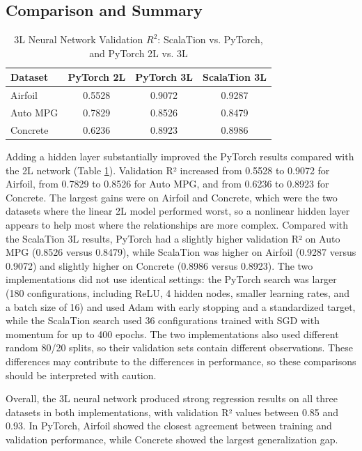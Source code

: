 \documentclass{article}
\begin{document}
\subsection{Comparison and Summary}
\begin{table}[H]
    \centering
    \caption{3L Neural Network Validation $R^2$: ScalaTion vs. PyTorch, and PyTorch 2L vs. 3L}
    \label{tab:3l_comparison}
    \begin{tabular}{lccc}
        \hline
        \textbf{Dataset} & \textbf{PyTorch 2L} & \textbf{PyTorch 3L} & \textbf{ScalaTion 3L} \\
        \hline
        Airfoil  & 0.5528 & 0.9072 & 0.9287 \\
        Auto MPG & 0.7829 & 0.8526 & 0.8479 \\
        Concrete & 0.6236 & 0.8923 & 0.8986 \\
        \hline
    \end{tabular}
\end{table}

Adding a hidden layer substantially improved the PyTorch results compared with the 2L network (Table \ref{tab:3l_comparison}). Validation R² increased from 0.5528 to 0.9072 for Airfoil, from 0.7829 to 0.8526 for Auto MPG, and from 0.6236 to 0.8923 for Concrete. The largest gains were on Airfoil and Concrete, which were the two datasets where the linear 2L model performed worst, so a nonlinear hidden layer appears to help most where the relationships are more complex. Compared with the ScalaTion 3L results, PyTorch had a slightly higher validation R² on Auto MPG (0.8526 versus 0.8479), while ScalaTion was higher on Airfoil (0.9287 versus 0.9072) and slightly higher on Concrete (0.8986 versus 0.8923). The two implementations did not use identical settings: the PyTorch search was larger (180 configurations, including ReLU, 4 hidden nodes, smaller learning rates, and a batch size of 16) and used Adam with early stopping and a standardized target, while the ScalaTion search used 36 configurations trained with SGD with momentum for up to 400 epochs. The two implementations also used different random 80/20 splits, so their validation sets contain different observations. These differences may contribute to the differences in performance, so these comparisons should be interpreted with caution.
\medskip

Overall, the 3L neural network produced strong regression results on all three datasets in both implementations, with validation R² values between 0.85 and 0.93. In PyTorch, Airfoil showed the closest agreement between training and validation performance, while Concrete showed the largest generalization gap.
\end{document}
